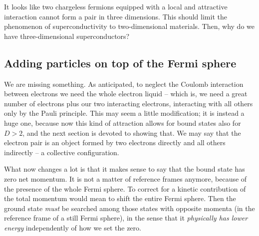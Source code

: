 It looks like two chargeless fermions equipped with a local and attractive interaction cannot form a pair in three dimensions. This should limit the phenomenon of superconductivity to two-dimensional materials. Then, why do we have three-dimensional superconductors? 

\subsection{Adding particles on top of the Fermi sphere}\label{subsec:adding particles on top of the fermi sphere}

We are missing something. As anticipated, to neglect the Coulomb interaction between electrons we need the whole electron liquid -- which is, we need a great number of electrons plus our two interacting electrons, interacting with all others only by the Pauli principle. This may seem a little modification; it is instead a huge one, because now this kind of attraction allows for bound states also for $D>2$, and the next section is devoted to showing that. We may say that the electron pair is an object formed by two electrons directly and all others indirectly -- a collective configuration.

What now changes a lot is that it makes sense to say that the bound state has zero net momentum. It is not a matter of reference frames anymore, because of the presence of the whole Fermi sphere. To correct for a kinetic contribution of the total momentum would mean to shift the entire Fermi sphere. Then the ground state \textit{must} be searched among those states with opposite momenta (in the reference frame of a still Fermi sphere), in the sense that it \textit{physically has lower energy} independently of how we set the zero.

